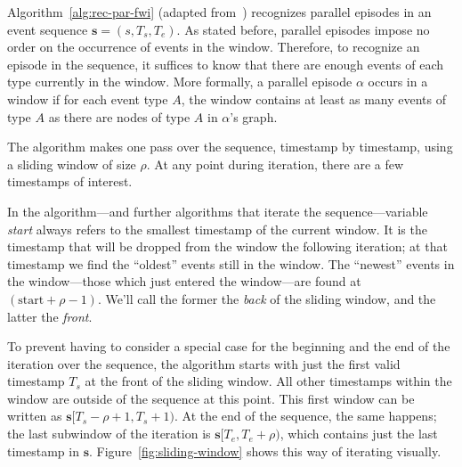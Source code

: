 Algorithm~\ref{alg:rec-par-fwi} (adapted from~\citep{mannila1997discovery}) recognizes parallel episodes in an event sequence $ \boldsymbol{s} = (s, T_s, T_e) $. As stated before, parallel episodes impose no order on the occurrence of events in the window. Therefore, to recognize an episode in the sequence, it suffices to know that there are enough events of each type currently in the window. More formally, a parallel episode $ \alpha $ occurs in a window if for each event type $ A $, the window contains at least as many events of type $ A $ as there are nodes of type $ A $ in $ \alpha $'s graph.

The algorithm makes one pass over the sequence, timestamp by timestamp, using a sliding window of size $ \rho $. At any point during iteration, there are a few timestamps of interest.

In the algorithm---and further algorithms that iterate the sequence---variable \emph{start} always refers to the smallest timestamp of the current window. It is the timestamp that will be dropped from the window the following iteration; at that timestamp we find the ``oldest'' events still in the window. The ``newest'' events in the window---those which just entered the window---are found at $ (\text{start} + \rho - 1) $. We'll call the former the \emph{back} of the sliding window, and the latter the \emph{front}.

To prevent having to consider a special case for the beginning and the end of the iteration over the sequence, the algorithm starts with just the first valid timestamp $ T_s $ at the front of the sliding window. All other timestamps within the window are outside of the sequence at this point. This first window can be written as $ \boldsymbol{s}[T_s - \rho + 1, T_s + 1) $. At the end of the sequence, the same happens; the last subwindow of the iteration is $ \boldsymbol{s}[T_e, T_e + \rho) $, which contains just the last timestamp in $ \boldsymbol{s} $. Figure~\ref{fig:sliding-window} shows this way of iterating visually.

